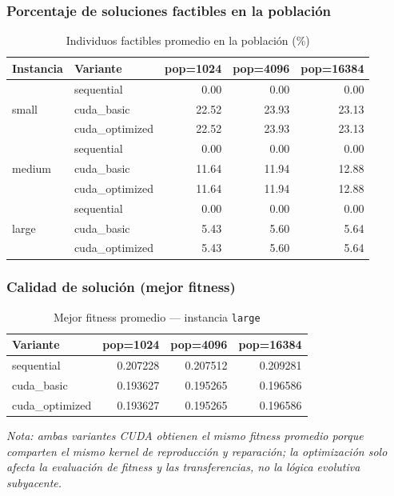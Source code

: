 \subsubsection{Porcentaje de soluciones factibles en la población}

\begin{table}[H]
  \centering
  \caption{Individuos factibles promedio en la población (\%)}
  \label{tab:exp1_factible}
  \begin{tabular}{llrrr}
    \toprule
    \textbf{Instancia} & \textbf{Variante} & \textbf{pop=1024} & \textbf{pop=4096} & \textbf{pop=16384} \\
    \midrule
    \multirow{3}{*}{small}
        & sequential      & 0.00  & 0.00  & 0.00  \\
        & cuda\_basic     & 22.52 & 23.93 & 23.13 \\
        & cuda\_optimized & 22.52 & 23.93 & 23.13 \\
    \midrule
    \multirow{3}{*}{medium}
        & sequential      & 0.00  & 0.00  & 0.00  \\
        & cuda\_basic     & 11.64 & 11.94 & 12.88 \\
        & cuda\_optimized & 11.64 & 11.94 & 12.88 \\
    \midrule
    \multirow{3}{*}{large}
        & sequential      & 0.00  & 0.00  & 0.00  \\
        & cuda\_basic     & 5.43  & 5.60  & 5.64  \\
        & cuda\_optimized & 5.43  & 5.60  & 5.64  \\
    \bottomrule
  \end{tabular}
\end{table}

\subsubsection{Calidad de solución (mejor fitness)}

\begin{table}[H]
  \centering
  \caption{Mejor fitness promedio — instancia \texttt{large}}
  \label{tab:exp1_fitness}
  \begin{tabular}{lrrr}
    \toprule
    \textbf{Variante} & \textbf{pop=1024} & \textbf{pop=4096} & \textbf{pop=16384} \\
    \midrule
    sequential        & 0.207228 & 0.207512 & 0.209281 \\
    cuda\_basic       & 0.193627 & 0.195265 & 0.196586 \\
    cuda\_optimized   & 0.193627 & 0.195265 & 0.196586 \\
    \bottomrule
  \end{tabular}
\end{table}
\noindent\textit{Nota: ambas variantes CUDA obtienen el mismo fitness promedio
porque comparten el mismo kernel de reproducción y reparación; la optimización
solo afecta la evaluación de fitness y las transferencias, no la lógica
evolutiva subyacente.}

